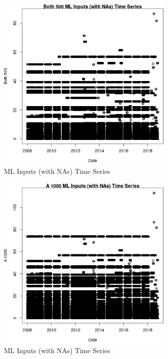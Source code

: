 \begin{figure} 
\centering  
\includegraphics[width=0.77\textwidth]{Code_Outputs/Report_ML_input_PM25_Step4_part_e_de_duplicated_aves_compiled_2019-05-20wNAs_Both_500vDate.jpg} 
\caption{\label{fig:Report_ML_input_PM25_Step4_part_e_de_duplicated_aves_compiled_2019-05-20wNAsBoth_500vDate}ML Inputs (with NAs) Time Series} 
\end{figure} 
 

\clearpage 

\begin{figure} 
\centering  
\includegraphics[width=0.77\textwidth]{Code_Outputs/Report_ML_input_PM25_Step4_part_e_de_duplicated_aves_compiled_2019-05-20wNAs_A_1000vDate.jpg} 
\caption{\label{fig:Report_ML_input_PM25_Step4_part_e_de_duplicated_aves_compiled_2019-05-20wNAsA_1000vDate}ML Inputs (with NAs) Time Series} 
\end{figure} 
 

